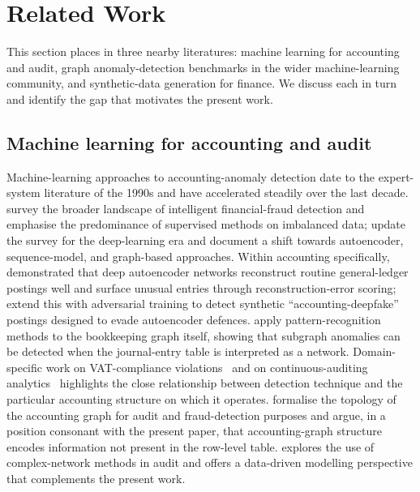 \section{Related Work}
\label{sec:related-work}

This section places \bench{} in three nearby literatures: machine
learning for accounting and audit, graph anomaly-detection benchmarks
in the wider machine-learning community, and synthetic-data generation
for finance.  We discuss each in turn and identify the gap that
motivates the present work.

\subsection{Machine learning for accounting and audit}
\label{sec:related-work:audit-ml}

Machine-learning approaches to accounting-anomaly detection date to the
expert-system literature of the 1990s and have accelerated steadily
over the last decade.  \citet{west2016intelligent} survey the broader
landscape of intelligent financial-fraud detection and emphasise the
predominance of supervised methods on imbalanced data;
\citet{hilal2022financial} update the survey for the deep-learning
era and document a shift towards autoencoder, sequence-model, and
graph-based approaches.  Within accounting specifically,
\citet{schreyer2017detection} demonstrated that deep autoencoder
networks reconstruct routine general-ledger postings well and surface
unusual entries through reconstruction-error scoring;
\citet{schreyer2019adversarial} extend this with adversarial training
to detect synthetic ``accounting-deepfake'' postings designed to
evade autoencoder defences.  \citet{liang2021bookkeeping} apply
pattern-recognition methods to the bookkeeping graph itself, showing
that subgraph anomalies can be detected when the journal-entry table
is interpreted as a network.  Domain-specific work on
VAT-compliance violations~\citep{lahann2019vat} and on
continuous-auditing analytics~\citep{vasarhelyi2004principles}
highlights the close relationship between detection technique and the
particular accounting structure on which it operates.
\citet{guo2022picture} formalise the topology of the accounting graph
for audit and fraud-detection purposes and argue, in a position
consonant with the present paper, that accounting-graph structure
encodes information not present in the row-level table.
\citet{boersma2024audit} explores the use of complex-network methods
in audit and offers a data-driven modelling perspective that
complements the present work.


